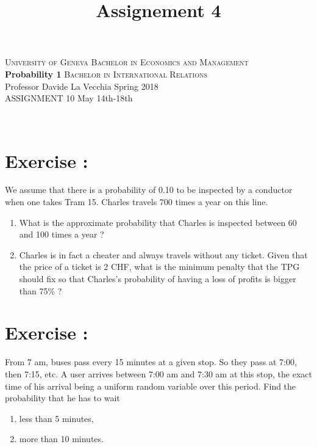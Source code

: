\documentclass[12pt,thmsa]{article}
\title{Assignement 4}
\begin{document}
\noindent \textsc{University of Geneva}     \hfill \textsc{Bachelor in Economics and Management} \\
\textbf{Probability 1}                      \hfill \textsc{Bachelor in International Relations} \\
Professor Davide La Vecchia                 \hfill Spring 2018  \\
ASSIGNMENT 10                               \hfill   May 14th-18th


\noindent
\makebox[\linewidth]{\rule{\textwidth}{0.4pt}}\\[1.5ex]




\addtocounter{section}{1}
\section*{Exercise \thesection:}


We assume that there is a probability of 0.10 to be inspected by a conductor when one takes Tram 15. Charles travels 700 times a year on this line.
 \begin{enumerate}
 \item What is the approximate probability that Charles is inspected between 60 and 100 times a year ?
 \item Charles is in fact a cheater and always travels without any ticket. Given that the price of a ticket is 2 CHF, what is the minimum penalty that the TPG
 should fix so that Charles's probability of having a loss of profits is bigger than 75\% ?
\end{enumerate}





\addtocounter{section}{1}
\section*{Exercise \thesection:}

From 7 am, buses pass every 15 minutes at a given stop. So they pass at 7:00, then 7:15, etc. A user arrives between 7:00 am and 7:30 am at this stop, the exact time of his arrival being a uniform random variable over this period. Find the probability that he has to wait
\begin{enumerate}%
\item less than 5 minutes,
\item more than 10 minutes.
\end{enumerate}
\end{document}
